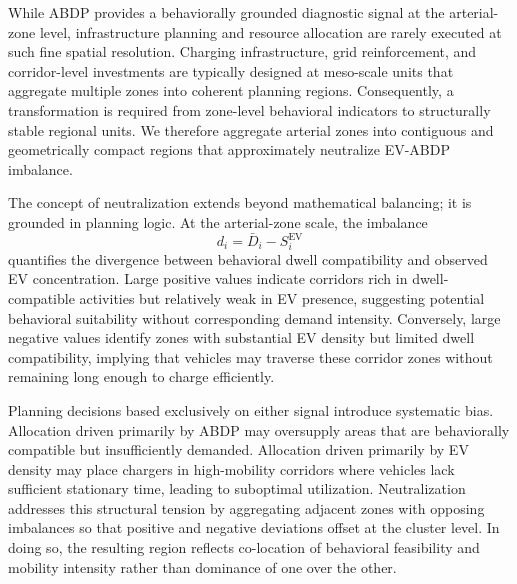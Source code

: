 \documentclass[conference]{IEEEtran}
\begin{document}
While ABDP provides a behaviorally grounded diagnostic signal at the
arterial-zone level, infrastructure planning and resource allocation
are rarely executed at such fine spatial resolution. Charging
infrastructure, grid reinforcement, and corridor-level investments
are typically designed at meso-scale units that aggregate multiple
zones into coherent planning regions. Consequently, a transformation
is required from zone-level behavioral indicators to structurally
stable regional units. We therefore aggregate arterial zones into
contiguous and geometrically compact regions that
approximately neutralize EV-ABDP imbalance.

The concept of neutralization extends beyond mathematical balancing;
it is grounded in planning logic. At the arterial-zone scale, the
imbalance
\begin{equation}
d_i = \bar{D}_i - S_i^{\mathrm{EV}}
\end{equation}
quantifies the divergence between behavioral dwell compatibility and observed EV concentration. Large positive values indicate corridors
rich in dwell-compatible activities but relatively weak in EV presence, suggesting potential behavioral suitability without corresponding demand intensity. Conversely, large negative values identify zones with substantial EV density but limited dwell
compatibility, implying that vehicles may traverse these corridor zones
without remaining long enough to charge efficiently.

Planning decisions based exclusively on either signal introduce systematic bias. Allocation driven primarily by ABDP may oversupply
areas that are behaviorally compatible but insufficiently demanded.
Allocation driven primarily by EV density may place chargers in
high-mobility corridors where vehicles lack sufficient stationary
time, leading to suboptimal utilization. Neutralization addresses
this structural tension by aggregating adjacent zones with opposing imbalances so that positive and negative deviations offset at the cluster level. In doing so, the resulting region reflects co-location
of behavioral feasibility and mobility intensity rather than dominance of one over the other.
\end{document}
